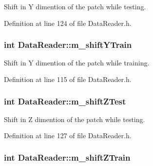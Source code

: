 Shift in Y dimention of the patch while testing. 



Definition at line 124 of file Data\+Reader.\+h.

\subsubsection[{\texorpdfstring{m\+\_\+shift\+Y\+Train}{m_shiftYTrain}}]{\setlength{\rightskip}{0pt plus 5cm}int Data\+Reader\+::m\+\_\+shift\+Y\+Train\hspace{0.3cm}{\ttfamily [private]}}\hypertarget{classDataReader_a2d564c01ed2225f2c853063113ef87b8}{}\label{classDataReader_a2d564c01ed2225f2c853063113ef87b8}


Shift in Y dimention of the patch while training. 



Definition at line 115 of file Data\+Reader.\+h.

\subsubsection[{\texorpdfstring{m\+\_\+shift\+Z\+Test}{m_shiftZTest}}]{\setlength{\rightskip}{0pt plus 5cm}int Data\+Reader\+::m\+\_\+shift\+Z\+Test\hspace{0.3cm}{\ttfamily [private]}}\hypertarget{classDataReader_a9f9ae5a90b34758f37671671e1f002f7}{}\label{classDataReader_a9f9ae5a90b34758f37671671e1f002f7}


Shift in Z dimention of the patch while testing. 



Definition at line 127 of file Data\+Reader.\+h.

\subsubsection[{\texorpdfstring{m\+\_\+shift\+Z\+Train}{m_shiftZTrain}}]{\setlength{\rightskip}{0pt plus 5cm}int Data\+Reader\+::m\+\_\+shift\+Z\+Train\hspace{0.3cm}{\ttfamily [private]}}\hypertarget{classDataReader_a0edec69c662462ca0189a5a47a567596}{}\label{classDataReader_a0edec69c662462ca0189a5a47a567596}


